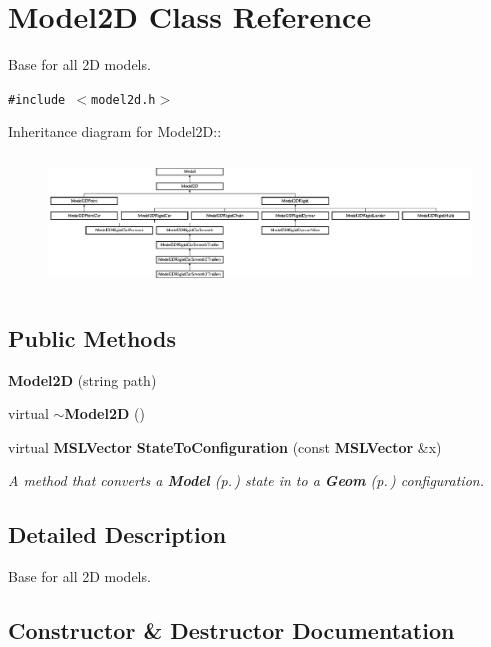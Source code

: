 \section{Model2D  Class Reference}
\label{class_Model2D}
Base for all 2D models. 


{\tt \#include $<$model2d.h$>$}

Inheritance diagram for Model2D::\begin{figure}[H]
\begin{center}
\leavevmode
\includegraphics[height=3.5387cm]{class_Model2D}
\end{center}
\end{figure}
\subsection*{Public Methods}
\begin{CompactItemize}
\item 
{\bf Model2D} (string path)
\item 
virtual {\bf $\sim$Model2D} ()
\item 
virtual {\bf MSLVector} {\bf State\-To\-Configuration} (const {\bf MSLVector} \&x)
\begin{CompactList}\small\item\em A method that converts a {\bf Model} {\rm (p.\,\pageref{class_Model})} state in to a {\bf Geom} {\rm (p.\,\pageref{class_Geom})} configuration.\item\end{CompactList}\end{CompactItemize}


\subsection{Detailed Description}
Base for all 2D models.



\subsection{Constructor \& Destructor Documentation}
